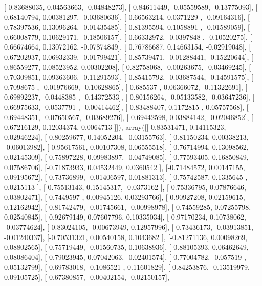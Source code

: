 \documentclass{article}
\begin{document}
       [ 0.83688035,  0.04563663, -0.04848273],
       [ 0.84611449, -0.05559589, -0.13775093],
       [ 0.68140794,  0.00381297, -0.03680636],
       [ 0.66563214,  0.0371229 , -0.09164316],
       [ 0.78397536,  0.13096264, -0.01435485],
       [ 0.81395594,  0.1058891 , -0.01589059],
       [ 0.66008779,  0.10629171, -0.18506157],
       [ 0.66332972, -0.0397848 , -0.10520275],
       [ 0.66674664,  0.13072162, -0.07874849],
       [ 0.76786687,  0.14663154, -0.02919048],
       [ 0.67202937,  0.06932339, -0.01799421],
       [ 0.85739471, -0.01288441, -0.15220644],
       [ 0.86559277,  0.08523952,  0.00302208],
       [ 0.82758068, -0.00263675, -0.03469245],
       [ 0.70309851,  0.09363606, -0.11291593],
       [ 0.85415792, -0.03687544, -0.14591575],
       [ 0.7098675 , -0.01976669, -0.10628865],
       [ 0.685537  ,  0.06366072, -0.11322691],
       [ 0.69892237, -0.0448385 , -0.14372533],
       [ 0.80156264, -0.05133582, -0.03647236],
       [ 0.66975633, -0.0537791 , -0.00414462],
       [ 0.83488407,  0.1172815 ,  0.05757568],
       [ 0.69448351, -0.07650567, -0.03689276],
       [ 0.69442598,  0.03884142, -0.02046852],
       [ 0.67216129,  0.12034374,  0.0064713 ]]), array([[-0.83531471,  0.14115323,  0.02946224],
       [-0.80259677,  0.14052204, -0.03155763],
       [-0.81150234,  0.00338213, -0.06013982],
       [-0.95617561,  0.00107308,  0.06555518],
       [-0.76714994,  0.13098562,  0.02145309],
       [-0.75897228,  0.09983897, -0.04749085],
       [-0.77593405,  0.16850849,  0.07586706],
       [-0.71873933,  0.04532449,  0.0360542 ],
       [-0.71484572,  0.00147155,  0.09195672],
       [-0.73736899, -0.01406597,  0.01881313],
       [-0.75742587,  0.1335645 ,  0.0215113 ],
       [-0.75513143,  0.15145317, -0.0373162 ],
       [-0.75336795,  0.07876646,  0.03802471],
       [-0.7449597 ,  0.00945126,  0.03293766],
       [-0.90927208,  0.02159615,  0.12162942],
       [-0.81742479, -0.01745661, -0.00998978],
       [-0.74559285,  0.07255798,  0.02540845],
       [-0.92679149,  0.07607796,  0.10335034],
       [-0.97170234,  0.10738062, -0.03774624],
       [-0.83024105, -0.00673949,  0.12957996],
       [-0.73436173, -0.03913851, -0.01240337],
       [-0.70531321,  0.00540158,  0.1043682 ],
       [-0.81271136,  0.00098269,  0.08802565],
       [-0.75719449, -0.01560735,  0.10638936],
       [-0.88105393,  0.06462649,  0.08086404],
       [-0.79023945,  0.07042063, -0.02401574],
       [-0.77004782, -0.057519  ,  0.05132799],
       [-0.69783018, -0.1086521 ,  0.11601829],
       [-0.84253876, -0.13519979,  0.09105725],
       [-0.67380857, -0.00402154, -0.02150157],
\end{document}
